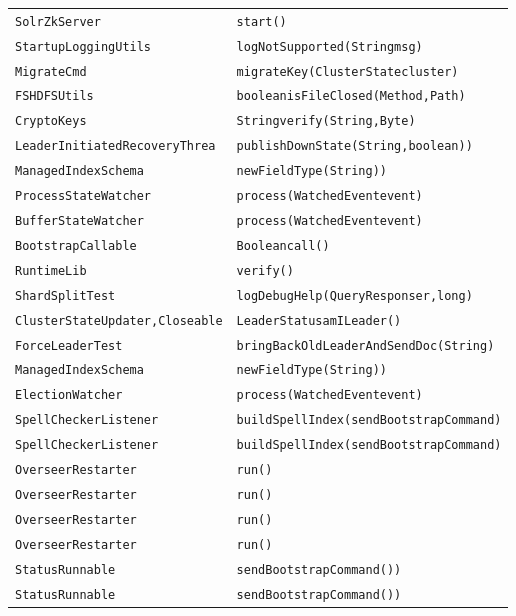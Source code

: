 \begin{center}
\begin{longtable}{ll}
\lstinline/SolrZkServer/&{\lstinline/start()/}\\
\lstinline/StartupLoggingUtils/&{\lstinline/logNotSupported(Stringmsg)/}\\
\lstinline/MigrateCmd/&{\lstinline/migrateKey(ClusterStatecluster)/}\\
\lstinline/FSHDFSUtils/&{\lstinline/booleanisFileClosed(Method,Path)/}\\
\lstinline/CryptoKeys/&{\lstinline/Stringverify(String,Byte)/}\\
\lstinline/LeaderInitiatedRecoveryThrea/&{\lstinline/publishDownState(String,boolean))/}\\
\lstinline/ManagedIndexSchema/&{\lstinline/newFieldType(String))/}\\
\lstinline/ProcessStateWatcher/&{\lstinline/process(WatchedEventevent)/}\\
\lstinline/BufferStateWatcher/&{\lstinline/process(WatchedEventevent)/}\\
\lstinline/BootstrapCallable/&{\lstinline/Booleancall()/}\\
\lstinline/RuntimeLib/&{\lstinline/verify()/}\\
\lstinline/ShardSplitTest/&{\lstinline/logDebugHelp(QueryResponser,long)/}\\
\lstinline/ClusterStateUpdater,Closeable/&{\lstinline/LeaderStatusamILeader()/}\\
\lstinline/ForceLeaderTest/&{\lstinline/bringBackOldLeaderAndSendDoc(String)/}\\
\lstinline/ManagedIndexSchema/&{\lstinline/newFieldType(String))/}\\
\lstinline/ElectionWatcher/&{\lstinline/process(WatchedEventevent)/}\\
\lstinline/SpellCheckerListener/&{\lstinline/buildSpellIndex(sendBootstrapCommand)/}\\
\lstinline/SpellCheckerListener/&{\lstinline/buildSpellIndex(sendBootstrapCommand)/}\\
\lstinline/OverseerRestarter/&{\lstinline/run()/}\\
\lstinline/OverseerRestarter/&{\lstinline/run()/}\\
\lstinline/OverseerRestarter/&{\lstinline/run()/}\\
\lstinline/OverseerRestarter/&{\lstinline/run()/}\\
\lstinline/StatusRunnable/&{\lstinline/sendBootstrapCommand())/}\\
\lstinline/StatusRunnable/&{\lstinline/sendBootstrapCommand())/}\\

\end{longtable}
\end{center}
